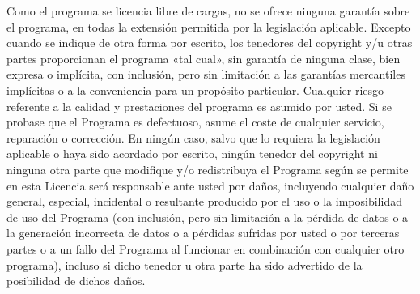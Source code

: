 Como el programa se licencia libre de cargas, no se ofrece ninguna garantía sobre el programa, en todas la extensión permitida por la legislación aplicable. Excepto cuando se indique de otra forma por escrito, los tenedores del copyright y/u otras partes proporcionan el programa «tal cual», sin garantía de ninguna clase, bien expresa o implícita, con inclusión, pero sin limitación a las garantías mercantiles implícitas o a la conveniencia para un propósito particular. Cualquier riesgo referente a la calidad y prestaciones del programa es asumido por usted. Si se probase que el Programa es defectuoso, asume el coste de cualquier servicio, reparación o corrección.
En ningún caso, salvo que lo requiera la legislación aplicable o haya sido acordado por escrito, ningún tenedor del copyright ni ninguna otra parte que modifique y/o redistribuya el Programa según se permite en esta Licencia será responsable ante usted por daños, incluyendo cualquier daño general, especial, incidental o resultante producido por el uso o la imposibilidad de uso del Programa (con inclusión, pero sin limitación a la pérdida de datos o a la generación incorrecta de datos o a pérdidas sufridas por usted o por terceras partes o a un fallo del Programa al funcionar en combinación con cualquier otro programa), incluso si dicho tenedor u otra parte ha sido advertido de la posibilidad de dichos daños.
